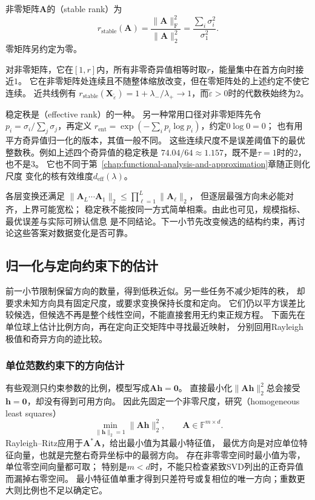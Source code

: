 \begin{definition}[稳定秩]
\label{def:matrix-analysis-stable-rank}
非零矩阵$\bm A$的（stable rank）为
\begin{equation}
 r_{\mathrm{stable}}(\bm A)
 =\frac{\lVert\bm A\rVert_{\mathrm F}^2}{\lVert\bm A\rVert_2^2}
 =\frac{\sum_i\sigma_i^2}{\sigma_1^2}.
 \label{eq:matrix-analysis-stable-rank}
\end{equation}
零矩阵另约定为零。
\end{definition}
对非零矩阵，它在$[1,r]$内，所有非零奇异值相等时取$r$，能量集中在首方向时接近$1$。
它在非零矩阵处连续且不随整体缩放改变，但在零矩阵处的上述约定不使它连续。
近共线例有
$r_{\mathrm{stable}}(\bm X_{\widetilde\varepsilon})
=1+\lambda_-/\lambda_+\to1$，而$\widetilde\varepsilon>0$时的代数秩始终为$2$。

稳定秩是（effective rank）的一种。
另一种常用口径对非零矩阵先令$p_i=\sigma_i/\sum_j\sigma_j$，再定义
$r_{\mathrm{ent}}=\exp(-\sum_i p_i\log p_i)$，约定$0\log0=0$；
也有用平方奇异值归一化的版本，其值一般不同。
这些连续尺度不是误差阈值下的最优整数秩。例如上述四个奇异值的稳定秩是
$74.04/64\approx1.157$，既不是$\tau=1$时的$2$，也不是$3$。
它也不同于第~\ref{chap:functional-analysis-and-approximation}章随正则化尺度
变化的核有效维度$d_{\mathrm{eff}}(\lambda)$。

各层变换还满足
$\lVert\bm A_L\cdots\bm A_1\rVert_2\leq\prod_{\ell=1}^L\lVert\bm A_\ell\rVert_2$，
但逐层最强方向未必能对齐，上界可能宽松；
稳定秩不能按同一方式简单相乘。由此也可见，规模指标、最优误差与实际可辨认信息
是不同结论。下一小节先改变候选的结构约束，再讨论这些答案对数据变化是否可靠。

\subsection{归一化与定向约束下的估计}
\label{sec:linear-algebra-constrained-estimation}

前一小节限制保留方向的数量，得到低秩近似。另一些任务不减少矩阵的秩，
却要求未知方向具有固定尺度，或要求变换保持长度和定向。
它们仍以平方误差比较候选，但候选不再是整个线性空间，不能直接套用无约束正规方程。
下面先在单位球上估计比例方向，再在定向正交矩阵中寻找最近映射，
分别回用Rayleigh极值和奇异方向的迹比较。

\subsubsection{单位范数约束下的方向估计}
\label{sec:linear-algebra-homogeneous-estimation}
有些观测只约束参数的比例，模型写成$\bm A\bm h=\bm0$。
直接最小化$\|\bm A\bm h\|_2^2$总会接受$\bm h=\bm0$，却没有得到可用方向。
因此先固定一个非零尺度，研究（homogeneous least squares）
\begin{equation}
 \min_{\|\bm h\|_2=1}\|\bm A\bm h\|_2^2,
 \qquad \bm A\in\mathbb F^{m\times d}.
 \label{eq:linear-algebra-homogeneous-least-squares}
\end{equation}
Rayleigh--Ritz应用于$\bm A^*\bm A$，给出最小值为其最小特征值，
最优方向是对应单位特征向量，也就是完整右奇异坐标中的最弱方向。
存在非零零空间时最小值为零，单位零空间向量都可取；
特别是$m<d$时，不能只检查紧致SVD列出的正奇异值而漏掉右零空间。
最小特征值单重才得到只差符号或复相位的唯一方向；重数更大则比例也不足以确定它。

